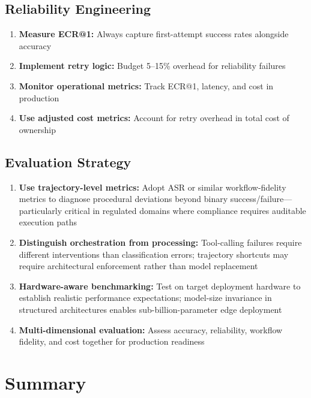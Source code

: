 \subsection{Reliability Engineering}

\begin{enumerate}[leftmargin=*]
    \item \textbf{Measure ECR@1:} Always capture first-attempt success rates alongside accuracy
    \item \textbf{Implement retry logic:} Budget 5--15\% overhead for reliability failures
    \item \textbf{Monitor operational metrics:} Track ECR@1, latency, and cost in production
    \item \textbf{Use adjusted cost metrics:} Account for retry overhead in total cost of ownership
\end{enumerate}

\subsection{Evaluation Strategy}

\begin{enumerate}[leftmargin=*]
    \item \textbf{Use trajectory-level metrics:} Adopt ASR or similar workflow-fidelity metrics to diagnose procedural deviations beyond binary success/failure---particularly critical in regulated domains where compliance requires auditable execution paths
    \item \textbf{Distinguish orchestration from processing:} Tool-calling failures require different interventions than classification errors; trajectory shortcuts may require architectural enforcement rather than model replacement
    \item \textbf{Hardware-aware benchmarking:} Test on target deployment hardware to establish realistic performance expectations; model-size invariance in structured architectures enables sub-billion-parameter edge deployment
    \item \textbf{Multi-dimensional evaluation:} Assess accuracy, reliability, workflow fidelity, and cost together for production readiness
\end{enumerate}

\section{Summary}
\label{sec:agentic_summary}

